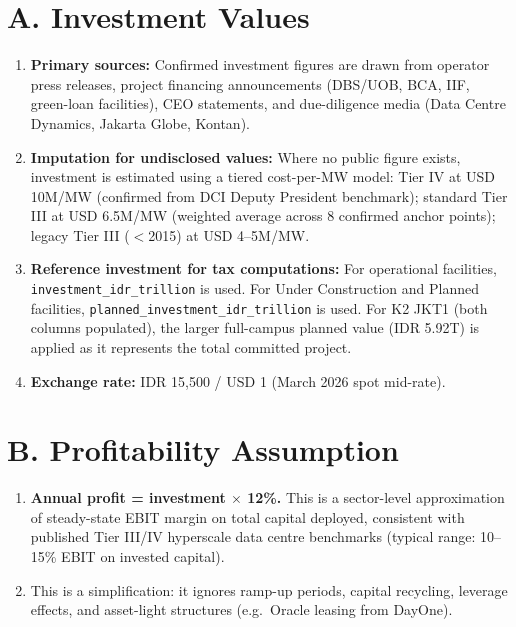 \documentclass[a4paper,10pt]{article}
\begin{document}
\vspace{6pt}

\section{A. Investment Values}
\begin{enumerate}
  \item \textbf{Primary sources:} Confirmed investment figures are drawn from operator press releases, project financing announcements (DBS/UOB, BCA, IIF, green-loan facilities), CEO statements, and due-diligence media (Data Centre Dynamics, Jakarta Globe, Kontan).
  \item \textbf{Imputation for undisclosed values:} Where no public figure exists, investment is estimated using a tiered cost-per-MW model: Tier IV at USD 10M/MW (confirmed from DCI Deputy President benchmark); standard Tier III at USD 6.5M/MW (weighted average across 8 confirmed anchor points); legacy Tier III ($<$2015) at USD 4--5M/MW.
  \item \textbf{Reference investment for tax computations:} For operational facilities, \texttt{investment\_idr\_trillion} is used. For Under Construction and Planned facilities, \texttt{planned\_investment\_idr\_trillion} is used. For K2 JKT1 (both columns populated), the larger full-campus planned value (IDR 5.92T) is applied as it represents the total committed project.
  \item \textbf{Exchange rate:} IDR 15,500 / USD 1 (March 2026 spot mid-rate).
\end{enumerate}

\section{B. Profitability Assumption}
\begin{enumerate}[resume]
  \item \textbf{Annual profit = investment $\times$ 12\%.} This is a sector-level approximation of steady-state EBIT margin on total capital deployed, consistent with published Tier III/IV hyperscale data centre benchmarks (typical range: 10--15\% EBIT on invested capital).
  \item This is a simplification: it ignores ramp-up periods, capital recycling, leverage effects, and asset-light structures (e.g.\ Oracle leasing from DayOne).
\end{enumerate}
\end{document}
